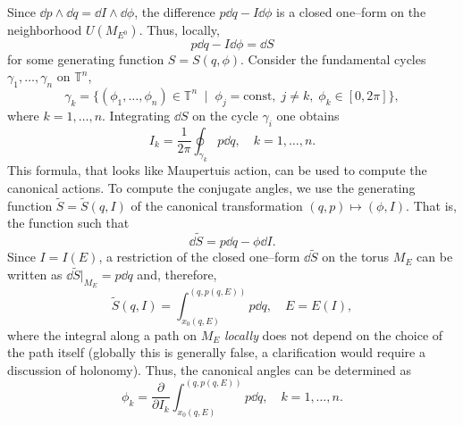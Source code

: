 \documentclass[english,fontsize=11pt,paper=b5]{scrbook}
\theoremstyle{definition}
\begin{document}
      Since $\dd p \wedge \dd q = \dd I \wedge \dd \phi$, the difference $p\dd q - I\dd \phi$ is a closed one--form on the neighborhood $U(M_{E^0})$. Thus, locally,
      \begin{equation}
        p\dd q - I\dd \phi = \dd S
      \end{equation}
      for some generating function $S = S(q,\phi)$.
      Consider the fundamental cycles $\gamma_1, \ldots, \gamma_n$ on $\mathbb{T}^n$,
      \begin{equation}
        \gamma_k = \big\{
          (\phi_1, \ldots, \phi_n) \in \mathbb{T}^n \;\mid\; \phi_j = \mathrm{const}, \; j\neq k,\; \phi_k \in [0,2\pi]
        \big\},
      \end{equation}
      where $k=1,\ldots,n$.
      Integrating $\dd S$ on the cycle $\gamma_i$ one obtains
      \begin{equation}
        I_k = \frac1{2\pi} \oint_{\gamma_k} p \dd q, \quad k=1,\ldots,n.
      \end{equation}
      This formula, that looks like Maupertuis action, can be used to compute the canonical actions.
      To compute the conjugate angles, we use the generating function $\widetilde S = \widetilde S(q,I)$ of the canonical transformation $(q,p) \mapsto (\phi, I)$. That is, the function such that
      \begin{equation}
        \dd\widetilde S = p\dd q - \phi \dd I.
      \end{equation}
      Since $I = I(E)$, a restriction of the closed one--form $\dd\widetilde S$ on the torus $M_E$ can be written as $\dd\widetilde S\big|_{M_E} = p\dd q$ and, therefore,
      \begin{equation}
        \widetilde S(q,I) = \int_{x_0(q,E)}^{(q, p(q,E))} p \dd q, \quad E = E(I),
      \end{equation}
      where the integral along a path on $M_E$ \emph{locally} does not depend on the choice of the path itself (globally this is generally false, a clarification would require a discussion of holonomy).
      Thus, the canonical angles can be determined as
      \begin{equation}
        \phi_k = \frac{\partial}{\partial I_k} \int_{x_0(q,E)}^{(q, p(q,E))} p \dd q, \quad k=1,\ldots,n.
      \end{equation}
\end{document}
